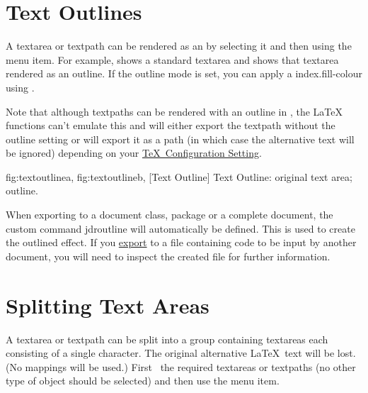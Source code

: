 
\section{Text Outlines}\label{sec:textoutline}


A \gls{textarea} or \gls{textpath} can be rendered as an
 by
selecting it and then using the 
menu item. For example,  shows a
standard \gls*{textarea} and  shows
that \gls*{textarea} rendered as an outline. If the outline mode is
set, you can apply a \gls{index.fill-colour} using
.

\begin{warning}
Note that although \glspl*{textpath} can be rendered with an outline in \FlowframTk,
the \LaTeX\  functions can't emulate
this and will either export the \gls*{textpath} without the outline
setting or will export it as a path (in which case the alternative
text will be ignored) depending on your
\hyperref[sec:texconfig]{\TeX\ Configuration Setting}.
\end{warning}

{
 {fig:textoutlinea}{}{},
 {fig:textoutlineb}{}{},
}
[Text Outline]
{Text Outline:  original text area;
   outline.}

When exporting to a document class, package or a complete document,
the custom command \gls{jdroutline} will automatically be defined.
This is used to create the outlined effect. If you 
\hyperref[sec:exportpgf]{export} to a file containing 
code to be input by another document, you will need to inspect the 
created  file for further information.


\section{Splitting Text Areas}\label{sec:splittext}


A \gls{textarea} or \gls{textpath} can be split into a \gls{group}
containing \glspl{textarea} each consisting of a single character.
The original alternative \LaTeX\ text will be lost. (No mappings
will be used.) First \select\ the required \glspl{textarea} or
\glspl{textpath} (no other type of \gls{object} should be selected)
and then use the  menu item.

